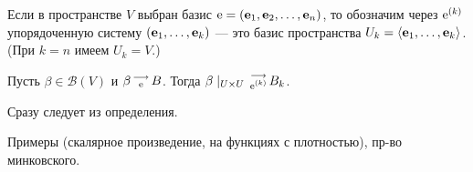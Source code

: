Если в пространстве $V$ выбран базис 
$\mathrm{e}=(\mathbf{e}_1, \mathbf{e}_2, \ldots , \mathbf{e}_n)$, то обозначим через $\mathrm{e}^{(k)}$ упорядоченную систему $(\mathbf{e}_1, \ldots , \mathbf{e}_k)$ --- это базис пространства
$U_k = \langle \mathbf{e}_1, \ldots , \mathbf{e}_k \rangle$. (При $k=n$ имеем $U_k=V$.)

\begin{predl}\label{p9_1_1}
Пусть $\beta \in \mathcal{B} (V)$ и $\beta \begin{smallmatrix} \longrightarrow \\ \mathrm{e} \end{smallmatrix} B$.
Тогда $\beta \mid_{U\times U} \begin{smallmatrix} \longrightarrow \\ \mathrm{e}^{(k)} \end{smallmatrix} B_k $.
\end{predl}
\dok Сразу следует из определения.
\edok

\otstup
Примеры (скалярное произведение, на функциях с плотностью), пр-во минковского. 
